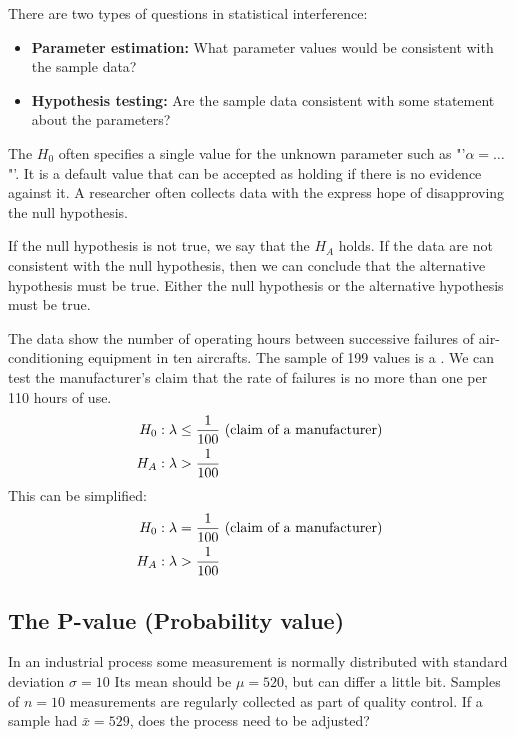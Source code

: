There are two types of questions in statistical interference:
\begin{itemize}
    \item \textbf{Parameter estimation:} What parameter values would be consistent with the sample data?
    \item \textbf{Hypothesis testing:} Are the sample data consistent with some statement about the parameters?
\end{itemize}

The  $H_0$ often specifies a single value for the unknown parameter such as "'$\alpha = \dots$"'. It is a default value that can be accepted as holding if there is no evidence against it. A researcher often collects data with the express hope of disapproving the null hypothesis.

If the null hypothesis is not true, we say that the  $H_A$ holds. If the data are not consistent with the null hypothesis, then we can conclude that the alternative hypothesis must be true. Either the null hypothesis or the alternative hypothesis must be true.

\begin{example}
    The data show the number of operating hours between successive failures of air-conditioning equipment in ten aircrafts. The sample of 199 values is a . We can test the manufacturer's claim that the rate of failures is no more than one per 110 hours of use.
    \begin{align}
        H_0: \lambda &\le \frac{1}{100}\text{ (claim of a manufacturer)} \notag \\
        H_A: \lambda &> \frac{1}{100} \notag
    \end{align}
    This can be simplified: \\
    \begin{align}
        H_0: \lambda &= \frac{1}{100}\text{ (claim of a manufacturer)} \notag \\
        H_A: \lambda &> \frac{1}{100} \notag
    \end{align}
\end{example}

\subsection{The P-value (Probability value)}

In an industrial process some measurement is normally distributed with standard deviation $\sigma = 10$ Its mean should be $\mu = 520$, but can differ a little bit. Samples of $n=10$ measurements are regularly collected as part of quality control. If a sample had $\bar{x}=529$, does the process need to be adjusted?

